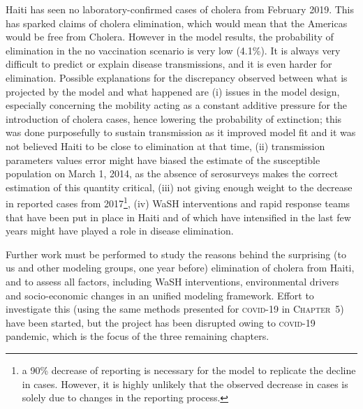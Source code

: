 Haiti has seen no laboratory-confirmed cases of cholera from February 2019. This has sparked claims of cholera elimination, which would mean that the Americas would be free from Cholera. However in the model results, the probability of elimination in the no vaccination scenario is very low (4.1\%). It is always very difficult to predict or explain disease transmissions, and it is even harder for elimination. Possible explanations for the discrepancy observed between what is projected by the model and what happened are (i) issues in the model design, especially concerning the mobility acting as a constant additive pressure for the introduction of cholera cases, hence lowering the probability of extinction; this was done purposefully to sustain transmission as it improved model fit and it was not believed Haiti to be close to elimination at that time, (ii) transmission parameters values error might have biased the estimate of the susceptible population on March 1, 2014, as the absence of serosurveys makes the correct estimation of this quantity critical, (iii) not giving enough weight to the decrease in reported cases from 2017\footnote[][-1.5\baselineskip]{a 90\% decrease of reporting is necessary for the model to replicate the decline in cases. However, it is highly unlikely that the observed decrease in cases is solely due to changes in the reporting process.}, (iv) WaSH interventions and rapid response teams that have been put in place in Haiti and of which have intensified in the last few years\cite{Rebaudet:CaseareaTargetedRapid:2019} might have played a role in disease elimination.
  
 Further work must be performed to study the reasons behind the surprising (to us and other modeling groups, one year before) elimination of cholera from Haiti, and to assess all factors, including WaSH interventions, environmental drivers and socio-economic changes in an unified modeling framework. Effort to investigate this (using the same methods presented for \textsc{covid}-19 in \textsc{Chapter~5}) have been started, but the project has been disrupted owing to \textsc{covid}-19 pandemic, which is the focus of the three remaining chapters.
 